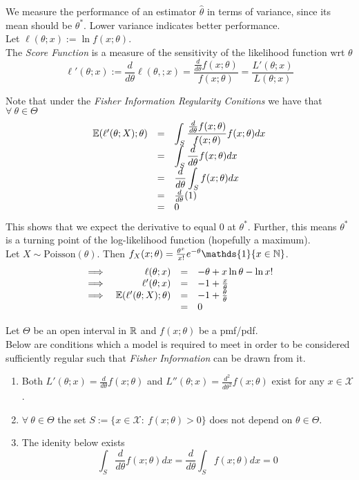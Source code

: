\documentclass[11pt,a4paper]{article}
\begin{document}
We measure the performance of an estimator $\hat{\theta}$ in terms of variance, since its mean should be $\theta^*$. Lower variance indicates better performance.\\

Let $\ell(\theta;x):=\ln f(x;\theta)$.\\
The \textit{Score Function} is a measure of the sensitivity of the likelihood function wrt $\theta$
$$\ell'(\theta;x):=\frac{d}{d\theta}\ell(\theta,;x)=\frac{\frac{d}{d\theta}f(x;\theta)}{f(x;\theta)}=\frac{L'(\theta;x)}{L(\theta;x)}$$

Note that under the \textit{Fisher Information Regularity Conitions} we have that $\forall\ \theta\in\Theta$
\[\begin{array}{rcl}
\mathbb{E}(\ell'(\theta;X);\theta)&=&{\displaystyle\int_S\dfrac{\frac{d}{d\theta}f(x;\theta)}{f(x;\theta)}f(x;\theta)dx}\\
&=&{\displaystyle\int_S\frac{d}{d\theta}f(x;\theta)dx}\\
&=&{\displaystyle\frac{d}{d\theta}\int_Sf(x;\theta)dx}\\
&=&\frac{d}{d\theta}(1)\\
&=&0
\end{array}\]
This shows that we expect the derivative to equal $0$ at $\theta^*$. Further, this means $\theta^*$ is a turning point of the log-likelihood function (hopefully a maximum).\\

Let $X\sim\text{Poisson}(\theta)$. Then $f_X(x;\theta)=\frac{\theta^x}{x!}e^{-\theta}\mathds{1}\{x\in\nats\}$.
\[\begin{array}{rrcl}
\implies&\ell(\theta;x)&=&-\theta+x\ln\theta-\ln x!\\
\implies&\ell'(\theta;x)&=&-1+\frac{x}{\theta}\\
\implies&\mathbb{E}(\ell'(\theta;X);\theta)&=&-1+\frac{\theta}{\theta}\\
&&=&0
\end{array}\]

Let $\Theta$ be an open interval in $\mathbb{R}$ and $f(x;\theta)$ be a pmf/pdf.\\
Below are conditions which a model is required to meet in order to be considered sufficiently regular such that \textit{Fisher Information} can be drawn from it.
\begin{enumerate}[label=\roman*)]
	\item Both $L'(\theta;x)=\frac{d}{d\theta}f(x;\theta)$ and $L''(\theta;x)=\frac{d^2}{d\theta^2}f(x;\theta)$ exist for any $x\in\mathcal{X}$.
	\item $\forall\ \theta\in\Theta$ the set $S:=\{x\in\mathcal{X}:\ f(x;\theta)>0\}$ does not depend on $\theta\in\Theta$.
	\item The idenity below exists
	$$\int_S\frac{d}{d\theta}f(x;\theta)dx=\frac{d}{d\theta}\int_Sf(x;\theta)dx=0$$
\end{enumerate}
\end{document}
